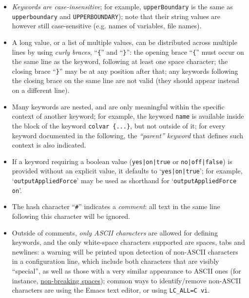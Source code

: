 \begin{itemize}

\item \emph{Keywords are case-insensitive}; for example, \texttt{upperBoundary} is the same as \texttt{upperboundary} and \texttt{UPPERBOUNDARY}); note that their string values are however still case-sensitive (e.g.{} names of variables, file names).

\item A long value, or a list of multiple values, can be distributed across multiple lines by using \emph{curly braces}, ``\texttt{\{}'' and ``\texttt{\}}'': the opening brace ``\texttt{\{}'' must occur on the same line as the keyword, following at least one space character; the closing brace ``\texttt{\}}'' may be at any position after that; any keywords following the closing brace on the same line are not valid (they should appear instead on a different line).

\item Many keywords are nested, and are only meaningful within the specific context of another keyword; for example, the keyword  \texttt{name} is available inside the block of the keyword \texttt{colvar \{...\}}, but not outside of it; for every keyword documented in the following, the \emph{``parent'' keyword} that defines such context is also indicated.

\item If a keyword requiring a boolean value (\texttt{yes|on|true} or \texttt{no|off|false}) is provided without an explicit value, it defaults to `\texttt{yes|on|true}'; for example, `\texttt{outputAppliedForce}' may be used as shorthand for `\texttt{outputAppliedForce on}'.

\item The hash character ``\texttt{\#}'' indicates a \emph{comment}: all text in the same line following this character will be ignored.

\item Outside of comments, \emph{only ASCII characters} are allowed for defining keywords, and the only white-space characters supported are spaces, tabs and newlines: a warning will be printed upon detection of non-ASCII characters in a configuration line, which include both characters that are visibly ``special'', as well as those with a very similar appearance to ASCII ones (for instance, \href{https://en.wikipedia.org/wiki/Non-breaking_space}{non-breaking spaces}); common ways to identify/remove non-ASCII characters are using the Emacs text editor, or using \texttt{LC\_ALL=C vi}.


\end{itemize}
